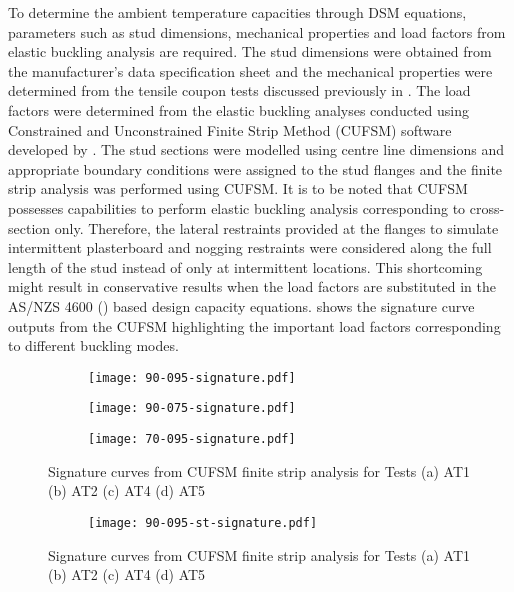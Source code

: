 To determine the ambient temperature capacities through DSM equations, parameters such as stud dimensions, mechanical properties and load factors from elastic buckling analysis are required. The stud dimensions were obtained from the manufacturer's data specification sheet and the mechanical properties were determined from the tensile coupon tests discussed previously in . The load factors were determined from the elastic buckling analyses conducted using Constrained and Unconstrained Finite Strip Method (CUFSM) software developed by \citet{Li2010a}. The stud sections were modelled using centre line dimensions and appropriate boundary conditions were assigned to the stud flanges and the finite strip analysis was performed using CUFSM. It is to be noted that CUFSM possesses capabilities to perform elastic buckling analysis corresponding to cross-section only. Therefore, the lateral restraints provided at the flanges to simulate intermittent plasterboard and nogging restraints were considered along the full length of the stud instead of only at intermittent locations. This shortcoming might result in conservative results when the load factors are substituted in the AS/NZS 4600 (\cite{ASNZ4600}) based design capacity equations.  shows the signature curve outputs from the CUFSM highlighting the important load factors corresponding to different buckling modes.     
\begin{figure}
	\centering
	\begin{subfigure}[b]{0.6\textwidth}
		\centering
		\texttt{[image: 90-095-signature.pdf]}
		\caption{}
		\label{subfig:90-095-signature}
	\end{subfigure}
	\begin{subfigure}[b]{0.6\textwidth}
		\centering
		\texttt{[image: 90-075-signature.pdf]}
		\caption{}
		\label{subfig:90-075-signature}
	\end{subfigure}
	\begin{subfigure}[b]{0.6\textwidth}
		\centering
		\texttt{[image: 70-095-signature.pdf]}
		\caption{}
		\label{subfig:70-095-signature}
	\end{subfigure}
	\caption{Signature curves from CUFSM finite strip analysis for Tests (a) AT1 (b) AT2 (c) AT4 (d) AT5}
		\label{fig:signature-curve-a}
\end{figure}
\begin{figure}
	\ContinuedFloat
	\centering
	\begin{subfigure}[b]{0.6\textwidth}
		\centering
		\texttt{[image: 90-095-st-signature.pdf]}
		\caption{}
		\label{subfig:90-095-st-signature}
	\end{subfigure}
		\caption{Signature curves from CUFSM finite strip analysis for Tests (a) AT1 (b) AT2 (c) AT4 (d) AT5}
		\label{fig:signature-curve}
\end{figure}
